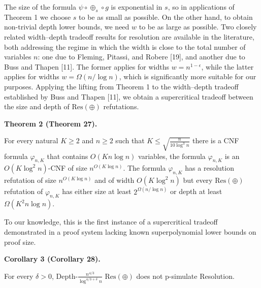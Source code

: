 \documentclass[10pt,a4paper]{article}
\begin{document}
The size of the formula $\psi\circ\oplus_{s}\circ g$ is exponential in $s$, so in applications of Theorem 1 we choose $s$ to be as small as possible. On the other hand, to obtain non-trivial depth lower bounds, we need $w$ to be as large as possible.
Two closely related width–depth tradeoff results for resolution are available in the literature, both addressing the regime in which the width is close to the total number of variables $n$: one due to Fleming, Pitassi, and Robere [19], and another due to Buss and Thapen [11].
The former applies for widths $w=n^{1-\epsilon}$, while the latter applies for widths $w=\Omega(n/\log n)$, which is significantly more suitable for our purposes. Applying the lifting from Theorem 1 to the width–depth tradeoff established by Buss and Thapen [11], we obtain a supercritical tradeoff between the size and depth of $\mathrm{Res}(\oplus)$ refutations.\par



\par\medskip\noindent\textbf{
Theorem 2 (Theorem 27).
}\par



For every natural $K\geq 2$ and $n\geq 2$ such that
$K\leq\sqrt{\frac{n}{10\log^{3}n}}$ there is a CNF formula $\varphi_{n,K}$
that contains $O(Kn\log n)$ variables, the formula $\varphi_{n,K}$ is an
$O(K\log^{2}n)$-CNF of size $n^{O(K\log n)}$.
The formula $\varphi_{n,K}$ has a resolution refutation of size $n^{O(K\log n)}$
and of width $O(K\log^{2}n)$ but every $\mathrm{Res}(\oplus)$ refutation of $\varphi_{n,K}$ has either size
at least $2^{\Omega(n/\log n)}$ or depth at least $\Omega(K^{2}n\log n)$.\par




To our knowledge, this is the first instance of a supercritical tradeoff demonstrated
in a proof system lacking known superpolynomial lower bounds on proof size.\par



\par\medskip\noindent\textbf{
Corollary 3 (Corollary 28).
}\par



For every $\delta>0$, Depth-$\frac{n^{4/3}}{\log^{4/3+\delta}n}$
$\mathrm{Res}(\oplus)$ does not p-simulate Resolution.\par
\end{document}
